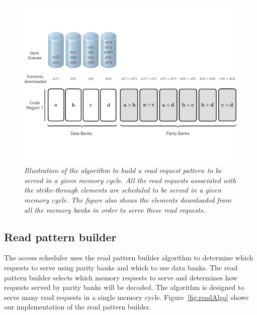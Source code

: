 \begin{figure}[htbp]
	\centering
	\includegraphics[width=0.96\linewidth]{fig/Read-Algo-Example.pdf}
	\caption{{\it{Illustration of the algorithm to build a read request pattern to be served in a given memory cycle. All the read requests associated with the strike-through elements are scheduled to be served in a given memory cycle. The figure also shows the elements downloaded from all the memory banks in order to serve these read requests.}}}
	\label{fig:readAlgoAccessPattern}
\end{figure}
\subsection{Read pattern builder}
\label{sec:readCodingAlgo}


The access scheduler uses the read pattern builder algorithm to determine which requests to serve using parity banks and which to use data banks. The read pattern builder selects which memory requests to serve and determines how requests served by parity banks will be decoded. The algorithm is designed to serve many read requests in a single memory cycle. Figure~\ref{fig:readAlgo} shows our implementation of the read pattern builder.

